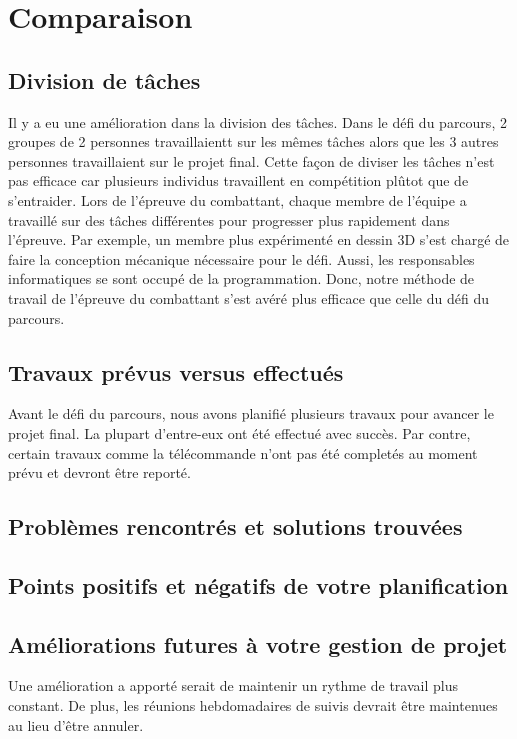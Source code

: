 \section{Comparaison}


\subsection{Division de tâches}

Il y a eu une amélioration dans la division des tâches. Dans le défi du parcours, 2 groupes de 2 personnes travaillaientt sur les mêmes tâches alors que les 3 autres personnes travaillaient sur le projet final. Cette façon de diviser les tâches n'est pas efficace car plusieurs individus travaillent en compétition plûtot que de s'entraider. Lors de l'épreuve du combattant, chaque membre de l'équipe a travaillé sur des tâches différentes pour progresser plus rapidement dans l'épreuve. Par exemple, un membre plus expérimenté en dessin 3D s'est chargé de faire la conception mécanique nécessaire pour le défi. Aussi, les responsables informatiques se sont occupé de la programmation.  Donc, notre méthode de travail de l'épreuve du combattant s'est avéré plus efficace que celle du défi du parcours.

\subsection{Travaux prévus versus effectués}

Avant le défi du parcours, nous avons planifié plusieurs travaux pour avancer le projet final. La plupart d'entre-eux ont été effectué avec succès. Par contre, certain travaux comme la télécommande n'ont pas été completés au moment prévu et devront être reporté.

\subsection{Problèmes rencontrés et solutions trouvées}


\subsection{Points positifs et négatifs de votre planification}


\subsection{Améliorations futures à votre gestion de projet}

Une amélioration a apporté serait de maintenir un rythme de travail plus constant. De plus, les réunions hebdomadaires de suivis devrait être maintenues au lieu d'être annuler.
